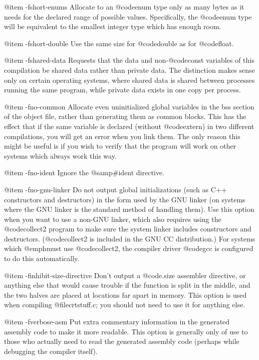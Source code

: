 {{@item -fshort-enums
Allocate to an @code{enum} type only as many bytes as it needs for the
declared range of possible values.  Specifically, the @code{enum} type
will be equivalent to the smallest integer type which has enough room.

@item -fshort-double
Use the same size for @code{double} as for @code{float}.

@item -fshared-data
Requests that the data and non-@code{const} variables of this
compilation be shared data rather than private data.  The distinction
makes sense only on certain operating systems, where shared data is
shared between processes running the same program, while private data
exists in one copy per process.

@item -fno-common
Allocate even uninitialized global variables in the bss section of the
object file, rather than generating them as common blocks.  This has the
effect that if the same variable is declared (without @code{extern}) in
two different compilations, you will get an error when you link them.
The only reason this might be useful is if you wish to verify that the
program will work on other systems which always work this way.

@item -fno-ident
Ignore the @samp{#ident} directive.

@item -fno-gnu-linker
Do not output global initializations (such as C++ constructors and
destructors) in the form used by the GNU linker (on systems where the GNU
linker is the standard method of handling them).  Use this option when
you want to use a non-GNU linker, which also requires using the
@code{collect2} program to make sure the system linker includes
constructors and destructors.  (@code{collect2} is included in the GNU CC
distribution.)  For systems which @emph{must} use @code{collect2}, the
compiler driver @code{gcc} is configured to do this automatically.

@item -finhibit-size-directive
Don't output a @code{.size} assembler directive, or anything else that
would cause trouble if the function is split in the middle, and the 
two halves are placed at locations far apart in memory.  This option is
used when compiling @file{crtstuff.c}; you should not need to use it
for anything else.

@item -fverbose-asm
Put extra commentary information in the generated assembly code to
make it more readable.  This option is generally only of use to those
who actually need to read the generated assembly code (perhaps while
debugging the compiler itself).

}}
